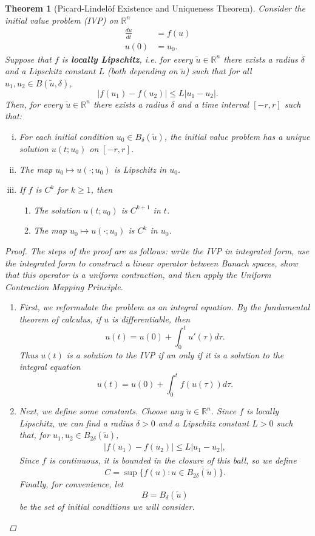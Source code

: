 \documentclass[12pt]{amsart}         %
\newtheorem{theorem}{Theorem}[section]
\theoremstyle{remark}
\newcommand{\R}{\mathbb{R}}
\begin{document}
\begin{theorem}[Picard-Lindel\"{o}f Existence and Uniqueness Theorem]
Consider the initial value problem (IVP) on $\R^n$
\begin{align*}
\frac{du}{dt} &= f(u) \\
u(0) &= u_0.
\end{align*}
Suppose that $f$ is \textbf{locally Lipschitz}, i.e. for every $\tilde{u} \in \R^n$ there exists a radius $\delta$ and a Lipschitz constant $L$ (both depending on $\tilde{u}$) such that for all $u_1, u_2 \in B(\tilde{u}, \delta)$,
\[
|f(u_1) - f(u_2)| \leq L|u_1 - u_2|.
\]
Then, for every $\tilde{u} \in \R^n$ there exists a radius $\delta$ and a time interval $[-r, r]$ such that:
\begin{enumerate}[(i)]
\item For each initial condition $u_0 \in B_\delta(\tilde{u})$, the initial value problem has a unique solution $u(t; u_0)$ on $[-r, r]$.
\item The map $u_0 \mapsto u(\cdot; u_0)$ is Lipschitz in $u_0$.
\item If $f$ is $C^k$ for $k \geq 1$, then
\begin{enumerate}
\item The solution $u(t; u_0)$ is $C^{k+1}$ in $t$.
\item The map $u_0 \mapsto u(\cdot; u_0)$ is $C^k$ in $u_0$.
\end{enumerate}
\end{enumerate}
\begin{proof}
The steps of the proof are as follows: write the IVP in integrated form, use the integrated form to construct a linear operator between Banach spaces, show that this operator is a uniform contraction, and then apply the Uniform Contraction Mapping Principle.
\begin{enumerate}

\item First, we reformulate the problem as an integral equation. By the fundamental theorem of calculus, if $u$ is differentiable, then
\begin{equation*}
u(t) = u(0) + \int_0^t u'(\tau) d \tau.
\end{equation*}
Thus $u(t)$ is a solution to the IVP if an only if it is a solution to the integral equation
\begin{equation}\label{intform}
u(t) = u(0) + \int_0^t f(u(\tau)) d \tau.
\end{equation}

\item Next, we define some constants. Choose any $\tilde{u} \in \R^n$. Since $f$ is locally Lipschitz, we can find a radius $\delta > 0$ and a Lipschitz constant $L > 0$ such that, for $u_1, u_2 \in B_{2 \delta}(\tilde{u})$,
\begin{align*}
|f(u_1) - f(u_2)| \leq L |u_1 - u_2|,
\end{align*}
Since $f$ is continuous, it is bounded in the closure of this ball, so we define
\[
C = \sup \{ f(u) : u \in \overline{ B_{2 \delta}(\tilde{u}) } \}.
\]
Finally, for convenience, let
\[
B = B_\delta(\tilde{u})
\]
be the set of initial conditions we will consider.


\end{enumerate}
\end{proof}
\end{theorem}
\end{document}

